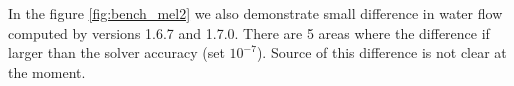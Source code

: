 
In the figure \ref{fig:bench_mel2} we also demonstrate small difference in water flow computed by versions 1.6.7 and 1.7.0. 
There are 5 areas where the difference if larger than the solver accuracy (set $10^{-7}$). Source of this difference 
is not clear at the moment.

